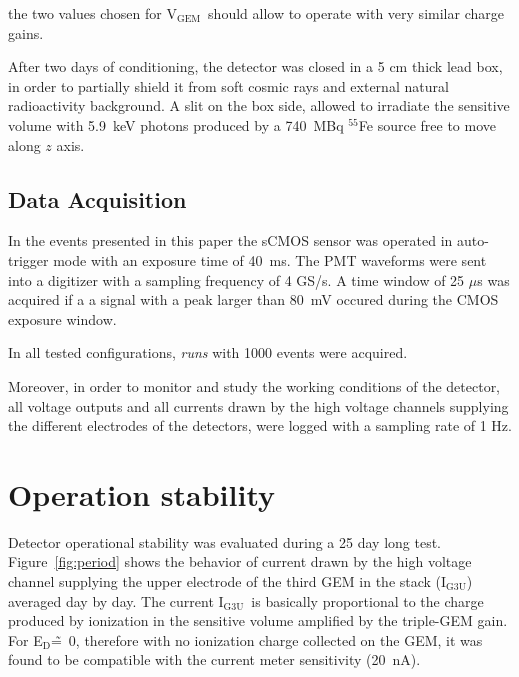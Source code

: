 \documentclass[a4paper,11pt]{article}
\newcommand{\Ig}  {I$_{\mathrm{G3U}}$}
\newcommand{\Ed}  {E$_{\mathrm{D}}$}
\newcommand{\Vg}  {V$_{\mathrm{GEM}}$}
\begin{document}
the two values chosen for \Vg\ should allow to operate with very similar charge gains.

After two days of conditioning, the detector was closed in a 5 cm thick lead box, in order to partially shield it from soft cosmic rays and external natural radioactivity background. A slit on the box side, allowed to irradiate the sensitive volume with 5.9~keV photons produced by a 740~MBq $^{55}$Fe source free to move along $z$ axis.

\subsection{Data Acquisition}
\label{sec:daq}

In the events presented in this paper the sCMOS sensor 
was operated in auto-trigger mode with an exposure time of 40~ms.
The PMT waveforms were sent into a digitizer with a sampling frequency of 4 GS/s. A time window of 25 $\mu$s was acquired if a a signal with a peak larger than 80~mV occured during the CMOS exposure window. 

In all tested configurations, {\it runs} with 1000 events were acquired.

Moreover, in order to monitor and study the working conditions of the detector, all voltage outputs and all currents drawn by the high voltage channels supplying the different electrodes of the detectors, were logged with a sampling rate of 1 Hz.

\section{Operation stability}

Detector operational stability was evaluated during a 25 day long test. 
Figure~\ref{fig:period} shows the behavior of current drawn by the high voltage channel supplying the upper electrode of the third GEM in the stack (\Ig) averaged day by day.
The current \Ig\ is basically proportional to the charge produced by ionization in the sensitive volume amplified by the triple-GEM gain.
For \Ed\~=~0, therefore with no ionization charge collected on the GEM, it was found to be compatible with the current meter sensitivity (20~nA).
\end{document}
